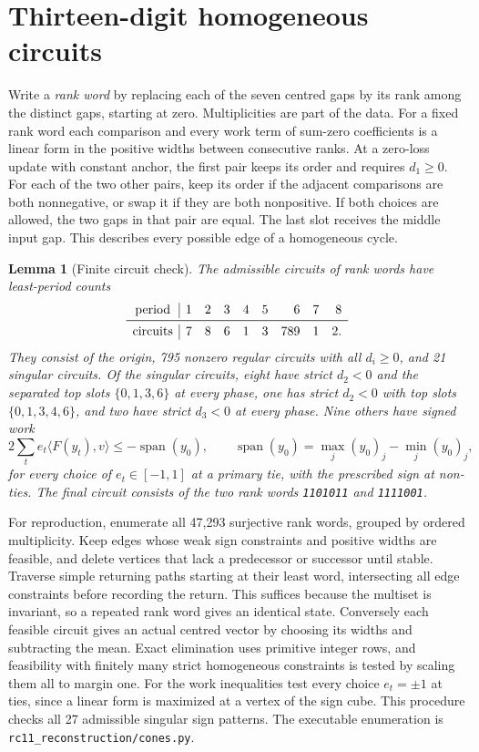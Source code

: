 \documentclass[11pt,reqno]{amsart}
\newtheorem{lemma}[theorem]{Lemma}
\theoremstyle{definition}
\newcommand{\file}[1]{\nolinkurl{#1}}
\begin{document}
\appendix
\section{Thirteen-digit homogeneous circuits}\label{app:odd}
Write a \emph{rank word} by replacing each of the seven centred gaps by its rank among the distinct gaps, starting at zero. Multiplicities are part of the data. For a fixed rank word each comparison and every work term of sum-zero coefficients is a linear form in the positive widths between consecutive ranks. At a zero-loss update with constant anchor, the first pair keeps its order and requires \(d_1\ge0\). For each of the two other pairs, keep its order if the adjacent comparisons are both nonnegative, or swap it if they are both nonpositive. If both choices are allowed, the two gaps in that pair are equal. The last slot receives the middle input gap. This describes every possible edge of a homogeneous cycle.

\begin{lemma}[Finite circuit check]\label{lem:circuits}
The admissible circuits of rank words have least-period counts
\[
\begin{array}{c|rrrrrrrr}
 \text{period}&1&2&3&4&5&6&7&8\\
 \midrule
 \text{circuits}&7&8&6&1&3&789&1&2 .
\end{array}
\]
They consist of the origin, 795 nonzero regular circuits with all \(d_i\ge0\), and 21 singular circuits. Of the singular circuits, eight have strict \(d_2<0\) and the separated top slots \(\{0,1,3,6\}\) at every phase, one has strict \(d_2<0\) with top slots \(\{0,1,3,4,6\}\), and two have strict \(d_3<0\) at every phase. Nine others have signed work
\[
 2\sum_t e_t\langle F(y_t),v\rangle\le-\operatorname{span}(y_0),
 \qquad \operatorname{span}(y_0)=\max_j(y_0)_j-\min_j(y_0)_j ,
\]
for every choice of \(e_t\in[-1,1]\) at a primary tie, with the prescribed sign at non-ties. The final circuit consists of the two rank words \texttt{1101011} and \texttt{1111001}.
\end{lemma}
For reproduction, enumerate all 47,293 surjective rank words, grouped by ordered multiplicity. Keep edges whose weak sign constraints and positive widths are feasible, and delete vertices that lack a predecessor or successor until stable. Traverse simple returning paths starting at their least word, intersecting all edge constraints before recording the return. This suffices because the multiset is invariant, so a repeated rank word gives an identical state. Conversely each feasible circuit gives an actual centred vector by choosing its widths and subtracting the mean. Exact elimination uses primitive integer rows, and feasibility with finitely many strict homogeneous constraints is tested by scaling them all to margin one. For the work inequalities test every choice \(e_t=\pm1\) at ties, since a linear form is maximized at a vertex of the sign cube. This procedure checks all 27 admissible singular sign patterns. The executable enumeration is \file{rc11_reconstruction/cones.py}.
\end{document}
